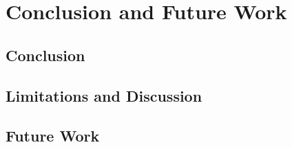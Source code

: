 \documentclass[a4paper, 11pt]{article}
\begin{document}
\section{Conclusion and Future Work}

\subsection{Conclusion}

\subsection{Limitations and Discussion}

\subsection{Future Work}

\newpage
\end{document}
